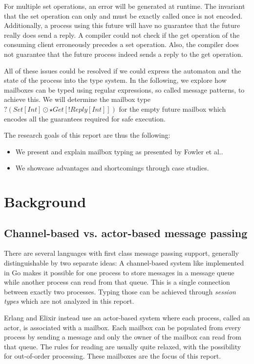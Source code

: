 For multiple set operations, an error will be generated at runtime.
The invariant that the set operation can only and must be exactly called once is not encoded.
Additionally, a process using this future will have no guarantee that the future really does send a reply.
A compiler could not check if the get operation of the consuming client erroneously precedes a set operation.
Also, the compiler does not guarantee that the future process indeed sends a reply to the get operation.

All of these issues could be resolved if we could express the automaton and the state of the process into the type system.
In the following, we explore how mailboxes can be typed using regular expressions, so called message patterns, to achieve this.
We will determine the mailbox type $?(Set[Int] \odot \star Get[!Reply[Int]])$ for the empty future mailbox which encodes all the guarantees required for safe execution.

The research goals of this report are thus the following:
\begin{itemize}
    \item We present and explain mailbox typing as presented by Fowler et al.\cite{fowlerSpecialDeliveryProgramming2023}.
    \item We showcase advantages and shortcomings through case studies.
\end{itemize}


\section{Background}
\label{sec:background}

\subsection{Channel-based vs. actor-based message passing}

There are several languages with first class message passing support, generally distinguishable by two separate ideas: A channel-based system like implemented in Go makes it possible for one process to store messages in a message queue while another process can read from that queue.
This is a single connection between exactly two processes.
Typing those can be achieved through \textit{session types} which are not analyzed in this report\cite{huttelFoundationsSessionTypes2016}.

Erlang and Elixir instead use an actor-based system where each process, called an actor, is associated with a mailbox.
Each mailbox can be populated from every process by sending a message and only the owner of the mailbox can read from that queue.
The rules for reading are usually quite relaxed, with the possibility for out-of-order processing.
These mailboxes are the focus of this report.



